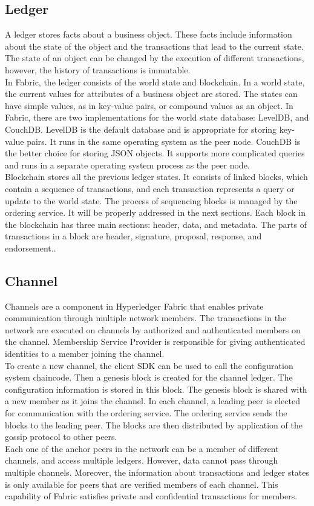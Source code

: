 \documentclass[sigconf,natbib=false]{acmart}
\begin{document}
    \subsection {Ledger}
    A ledger stores facts about a business object. These facts include information about the state of the object and the transactions that lead to the current state. The state of an object can be changed by the execution of different transactions, however, the history of transactions is immutable.\\
    In Fabric, the ledger consists of the world state and blockchain. In a world state, the current values for attributes of a business object are stored. The states can have simple values, as in key-value pairs, or compound values as an object. In Fabric, there are two implementations for the world state database: LevelDB, and CouchDB. LevelDB is the default database and is appropriate for storing key-value pairs. It runs in the same operating system as the peer node. CouchDB is the better choice for storing JSON objects. It supports more complicated queries and runs in a separate operating system process as the peer node.\\
    Blockchain stores all the previous ledger states. It consists of linked blocks, which contain a sequence of transactions, and each transaction represents a query or update to the world state. The process of sequencing blocks is managed by the ordering service. It will be properly addressed in the next sections. Each block in the blockchain has three main sections: header, data, and metadata. The parts of transactions in a block are header, signature, proposal, response, and endorsement.\cite{ledger}.
    \subsection{Channel}
    Channels are a component in Hyperledger Fabric that enables private communication through multiple network members. The transactions in the network are executed on channels by authorized and authenticated members on the channel. Membership Service Provider is responsible for giving authenticated identities to a member joining the channel.\\
    To create a new channel, the client SDK can be used to call the configuration system chaincode. Then a genesis block is created for the channel ledger. The configuration information is stored in this block. The genesis block is shared with a new member as it joins the channel.
    In each channel, a leading peer is elected for communication with the ordering service. The ordering service sends the blocks to the leading peer. The blocks are then distributed by application of the gossip protocol to other peers.\\
    Each one of the anchor peers in the network can be a member of different channels, and access multiple ledgers. However, data cannot pass through multiple channels. Moreover, the information about transactions and ledger states is only available for peers that are verified members of each channel. This capability of Fabric satisfies private and confidential transactions for members.\cite{channel}
\end{document}

